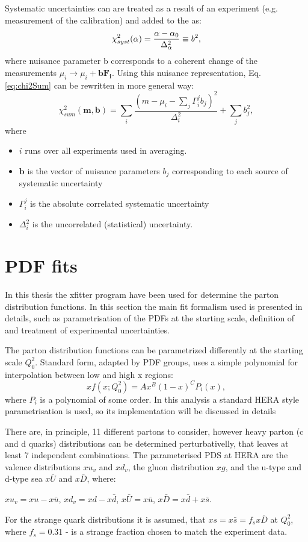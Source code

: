 Systematic uncertainties can are treated as a result of an experiment (e.g. measurement of the calibration) and added to the \chiD as:
\begin{equation}
\chi^2_{syst}(\alpha) = \frac{\alpha-\alpha_0}{\Delta_{\alpha}^2}\equiv b^2,
\end{equation}
where nuisance parameter b corresponds to a coherent change of the measurements $\mu_i \to \mu_i+\mathbf{bF_i}$. Using this nuisance representation, Eq. \ref{eq:chi2Sum} can be rewritten in more general way:
\begin{equation}\label{Eq:ChiDParam}
\chi^{2}_{sum}(\mathbf{m},\mathbf{b})=\sum_{i} \frac{(m-\mu_i-\sum_j\Gamma_i^jb_j)^2}{\Delta_i^2}+\sum_j b_j^2, 
\end{equation}
where
\begin{itemize}
\item $i$ runs over all experiments used in averaging. 
\item $\mathbf{b}$ is the vector of nuisance parameters $b_j$ corresponding to each source of systematic uncertainty
\item $\Gamma_i^j$ is the absolute correlated systematic uncertainty
\item $\Delta_i^2$ is the uncorrelated (statistical) uncertainty.
\end{itemize}


\section{PDF fits}\label{sec:PDFFit}
In this thesis the xfitter program have been used for determine the parton distribution functions. In this section the main fit formalism used is presented in details, such as parametrisation of the PDFs at the starting scale, definition of \chiD and treatment of experimental uncertainties.

The parton distribution functions can be parametrized differently at the starting scale $Q^2_0$. Standard form, adapted by PDF groups, uses a simple polynomial for interpolation between low and high x regions:
\begin{equation}
xf(x; Q^2_0) = A x^{B} (1-x)^{C} P_{i}(x),
\end{equation}
where $P_{i}$ is a polynomial of some order. In this analysis a standard HERA style parametrisation is used, so its implementation will be discussed in details

There are, in principle, 11 different partons to consider, however heavy parton (c and d quarks) distributions can be determined perturbativelly, that leaves at least 7 independent combinations. The parameterised PDS at HERA are the valence distributions $xu_{v}$ and $xd_{v}$, the gluon distribution $xg$, and the u-type and d-type sea $x\bar{U}$ and $x\bar{D}$, where:
\begin{center}
$xu_{v} = xu - x\bar{u}$,  $xd_{v} = xd-x\bar{d}$,   $x\bar{U}=x\bar{u}$,  $x\bar{D}=x\bar{d}+x\bar{s}$. 
\end{center}
For the strange quark distributions it is assumed, that $xs = x\bar{s} = f_sx\bar{D}$ at $Q^2_0$, where $f_s = 0.31$ - is a strange fraction chosen to match the experiment data. 

